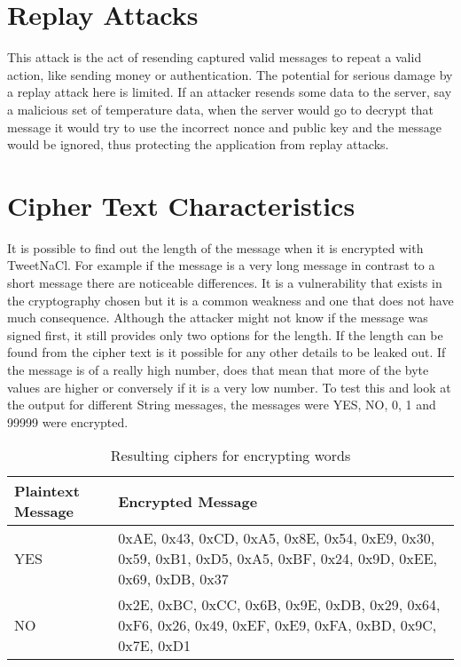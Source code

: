 \section{Replay Attacks}

This attack is the act of resending captured valid messages to repeat a valid action, like sending money or authentication. The potential for serious damage by a replay attack here is limited. If an attacker resends some data to the server, say a malicious set of temperature data, when the server would go to decrypt that message it would try to use the incorrect nonce and public key and the message would be ignored, thus protecting the application from replay attacks.

\section{Cipher Text Characteristics}

It is possible to find out the length of the message when it is encrypted with TweetNaCl. For example if the message is a very long message in contrast to a short message there are noticeable differences. It is a vulnerability that exists in the cryptography chosen but it is a common weakness and one that does not have much consequence. Although the attacker might not know if the message was signed first, it still provides only two options for the length. If the length can be found from the cipher text is it possible for any other details to be leaked out. If the message is of a really high number, does that mean that more of the byte values are higher or conversely if it is a very low number. To test this and look at the output for different String messages, the messages were YES, NO, 0, 1 and 99999 were encrypted. 

\begin{table}[H]
	\centering
	\begin{tabular}{ | l | p{7cm} | }
	\hline
	Plaintext Message & Encrypted Message \\ \hline
	YES & 0xAE, 0x43, 0xCD, 0xA5, 0x8E, 0x54, 0xE9,  0x30, 0x59, 0xB1, 0xD5, 0xA5, 0xBF, 0x24, 0x9D, 0xEE, 0x69, 0xDB, 0x37  \\ \hline
	NO &  0x2E, 0xBC, 0xCC, 0x6B, 0x9E, 0xDB, 0x29, 0x64, 0xF6, 0x26, 0x49, 0xEF, 0xE9, 0xFA, 0xBD, 0x9C, 0x7E, 0xD1 \\ \hline
	\end{tabular}
	\caption{Resulting ciphers for encrypting words}
	\label{tab:yesno}
\end{table}

